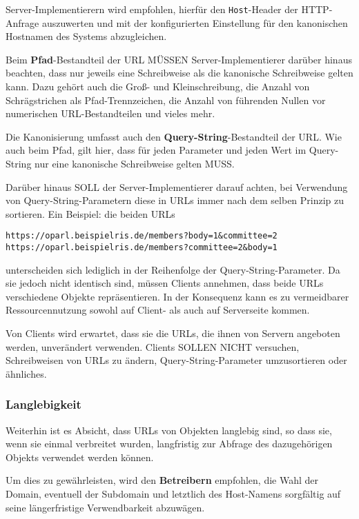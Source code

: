 \documentclass[,a4paper]{article}
\begin{document}
Server-Implementierern wird empfohlen, hierfür den \texttt{Host}-Header
der HTTP-Anfrage auszuwerten und mit der konfigurierten Einstellung für
den kanonischen Hostnamen des Systems abzugleichen.

Beim \textbf{Pfad}-Bestandteil der URL MÜSSEN Server-Implementierer
darüber hinaus beachten, dass nur jeweils eine Schreibweise als die
kanonische Schreibweise gelten kann. Dazu gehört auch die Groß- und
Kleinschreibung, die Anzahl von Schrägstrichen als Pfad-Trennzeichen,
die Anzahl von führenden Nullen vor numerischen URL-Bestandteilen und
vieles mehr.

Die Kanonisierung umfasst auch den \textbf{Query-String}-Bestandteil der
URL. Wie auch beim Pfad, gilt hier, dass für jeden Parameter und jeden
Wert im Query-String nur eine kanonische Schreibweise gelten MUSS.

Darüber hinaus SOLL der Server-Implementierer darauf achten, bei
Verwendung von Query-String-Parametern diese in URLs immer nach dem
selben Prinzip zu sortieren. Ein Beispiel: die beiden URLs

\begin{verbatim}
https://oparl.beispielris.de/members?body=1&committee=2
https://oparl.beispielris.de/members?committee=2&body=1
\end{verbatim}

unterscheiden sich lediglich in der Reihenfolge der
Query-String-Parameter. Da sie jedoch nicht identisch sind, müssen
Clients annehmen, dass beide URLs verschiedene Objekte repräsentieren.
In der Konsequenz kann es zu vermeidbarer Ressourcennutzung sowohl auf
Client- als auch auf Serverseite kommen.

Von Clients wird erwartet, dass sie die URLs, die ihnen von Servern
angeboten werden, unverändert verwenden. Clients SOLLEN NICHT versuchen,
Schreibweisen von URLs zu ändern, Query-String-Parameter umzusortieren
oder ähnliches.

\subsubsection{Langlebigkeit}\label{langlebigkeit}

Weiterhin ist es Absicht, dass URLs von Objekten langlebig sind, so dass
sie, wenn sie einmal verbreitet wurden, langfristig zur Abfrage des
dazugehörigen Objekts verwendet werden können.

Um dies zu gewährleisten, wird den \textbf{Betreibern} empfohlen, die
Wahl der Domain, eventuell der Subdomain und letztlich des Host-Namens
sorgfältig auf seine längerfristige Verwendbarkeit abzuwägen.
\end{document}
